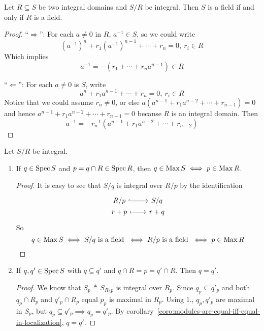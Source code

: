 \begin{prop}
  Let $R \subseteq S$ be two integral domains and $S/R$ be integral. Then $S$ is a field if and only if $R$ is a field.

  \begin{proof}
    ``$\Rightarrow$'': For each $a \neq 0$ in $R$, $a^{-1} \in S$, so we could write
    \[ (a^{-1})^n + r_1 (a^{-1})^{n-1} + \dotsb + r_n = 0, \ r_i \in R \]
    Which implies
    \[ a^{-1}  = - (r_1 + \dotsb + r_n a^{n-1}) \in R \]

    ``$\Leftarrow$'': For each $a \neq 0$ is $S$, write
    \[ a^n + r_1 a^{n-1} + \dotsb + r_n = 0, \ r_i \in R \]
    Notice that we could assume $r_n \neq 0$, or else $a (a^{n-1} + r_1 a^{n-2} + \dotsb + r_{n-1}) = 0$
    and hence $a^{n-1} + r_1 a^{n-2} + \dotsb + r_{n-1} = 0$ because $R$ is an integral domain.
    Then
    \[ a^{-1} = - r_n^{-1} (a^{n-1} + r_1 a^{n-2} + \dotsb + r_{n-2}) \]
  \end{proof}
\end{prop}

\begin{prop} \label{prop:property-of-contraction-if-integral}
  Let $S/R$ be integral.
  \begin{enumerate}
    \item If $q \in \operatorname{Spec} S$ and $p = q \cap R \in \operatorname{Spec} R$, then
      $q \in \operatorname{Max} S \iff p \in \operatorname{Max} R$.

    \begin{proof}
      It is easy to see that $S/q$ is integral over $R/p$ by the identification
      \[
        \begin{tikzcd}[column sep=0.8cm,row sep=0ex]
          R/p \arrow[r, hookrightarrow] & S/q \\
          r+p \arrow[r, mapsto] & r+q
        \end{tikzcd}
      \]
      So \[ q \in \operatorname{Max} S \iff S/q \text{ is a field } \iff R/p \text{ is a field } \iff p \in \operatorname{Max} R \]
    \end{proof}
    \item If $q, q' \in \operatorname{Spec} S$ with $q \subseteq q'$ and $q \cap R = p = q' \cap R$.
      Then $q = q'$.
    \begin{proof}
      We know that $S_p \triangleq S_{R \setminus p}$ is integral over $R_p$.
      Since $q_p \subseteq q'_p$ and both $q_p \cap R_p$ and $q'_p \cap R_p$
      equal $p_p$ is maximal in $R_p$. Using 1., $q_p, q'_p$ are maximal
      in $S_p$, but $q_p \subseteq q'_p \implies q_p = q'_p$.
      By corollary~\ref{coro:modules-are-equal-iff-equal-in-localization},
      $q = q'$.
    \end{proof}
  \end{enumerate}

\end{prop}


